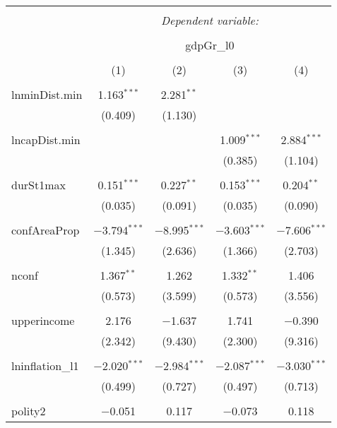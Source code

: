 
\begin{table}[!htbp] \centering 
  \caption{} 
  \label{} 
\begin{tabular}{@{\extracolsep{5pt}}lcccc} 
\\[-1.8ex]\hline 
\hline \\[-1.8ex] 
 & \multicolumn{4}{c}{\textit{Dependent variable:}} \\ 
\cline{2-5} 
\\[-1.8ex] & \multicolumn{4}{c}{gdpGr\_l0} \\ 
\\[-1.8ex] & (1) & (2) & (3) & (4)\\ 
\hline \\[-1.8ex] 
 lnminDist.min & 1.163$^{***}$ & 2.281$^{**}$ &  &  \\ 
  & (0.409) & (1.130) &  &  \\ 
  & & & & \\ 
 lncapDist.min &  &  & 1.009$^{***}$ & 2.884$^{***}$ \\ 
  &  &  & (0.385) & (1.104) \\ 
  & & & & \\ 
 durSt1max & 0.151$^{***}$ & 0.227$^{**}$ & 0.153$^{***}$ & 0.204$^{**}$ \\ 
  & (0.035) & (0.091) & (0.035) & (0.090) \\ 
  & & & & \\ 
 confAreaProp & $-$3.794$^{***}$ & $-$8.995$^{***}$ & $-$3.603$^{***}$ & $-$7.606$^{***}$ \\ 
  & (1.345) & (2.636) & (1.366) & (2.703) \\ 
  & & & & \\ 
 nconf & 1.367$^{**}$ & 1.262 & 1.332$^{**}$ & 1.406 \\ 
  & (0.573) & (3.599) & (0.573) & (3.556) \\ 
  & & & & \\ 
 upperincome & 2.176 & $-$1.637 & 1.741 & $-$0.390 \\ 
  & (2.342) & (9.430) & (2.300) & (9.316) \\ 
  & & & & \\ 
 lninflation\_l1 & $-$2.020$^{***}$ & $-$2.984$^{***}$ & $-$2.087$^{***}$ & $-$3.030$^{***}$ \\ 
  & (0.499) & (0.727) & (0.497) & (0.713) \\ 
  & & & & \\ 
 polity2 & $-$0.051 & 0.117 & $-$0.073 & 0.118 \\ 

\end{tabular}
\end{table}
